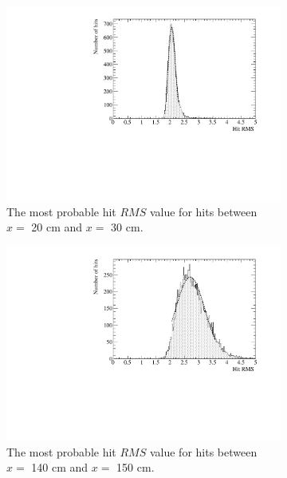 \begin{figure}[h!]
  \centering
  \begin{subfigure}{0.45\textwidth}
    \centering
    \includegraphics[width=\textwidth]{DataCan_0}
    \caption{The most probable hit $RMS$ value for hits between $x =$ 20 cm and $x =$ 30 cm.}
  \end{subfigure}
  \hspace{0.08\textwidth}
  \begin{subfigure}{0.45\textwidth}
    \centering
    \includegraphics[width=\textwidth]{DataCan_1}
    \caption{The most probable hit $RMS$ value for hits between $x =$ 140 cm and $x =$ 150 cm.}
  \end{subfigure}
  \begin{subfigure}{0.45\textwidth}
    \centering

\end{subfigure}
\end{figure}
